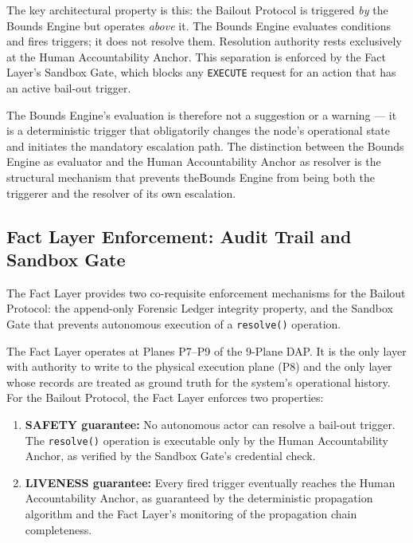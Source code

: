 The key architectural property is this: the Bailout Protocol is triggered \emph{by} the Bounds Engine but operates \emph{above} it. The Bounds Engine evaluates conditions and fires triggers; it does not resolve them. Resolution authority rests exclusively at the Human Accountability Anchor. This separation is enforced by the Fact Layer's Sandbox Gate, which blocks any \texttt{EXECUTE} request for an action that has an active bail-out trigger.

The Bounds Engine's evaluation is therefore not a suggestion or a warning --- it is a deterministic trigger that obligatorily changes the node's operational state and initiates the mandatory escalation path. The distinction between the Bounds Engine as evaluator and the Human Accountability Anchor as resolver is the structural mechanism that prevents theBounds Engine from being both the triggerer and the resolver of its own escalation.

\subsection{Fact Layer Enforcement: Audit Trail and Sandbox Gate}
\label{sec:fact-layer-enforcement}

The Fact Layer provides two co-requisite enforcement mechanisms for the Bailout Protocol: the append-only Forensic Ledger integrity property, and the Sandbox Gate that prevents autonomous execution of a \texttt{resolve()} operation.

The Fact Layer operates at Planes P7--P9 of the 9-Plane DAP. It is the only layer with authority to write to the physical execution plane (P8) and the only layer whose records are treated as ground truth for the system's operational history. For the Bailout Protocol, the Fact Layer enforces two properties:

\begin{enumerate}
  \item \textbf{SAFETY guarantee:} No autonomous actor can resolve a bail-out trigger. The \texttt{resolve()} operation is executable only by the Human Accountability Anchor, as verified by the Sandbox Gate's credential check.

  \item \textbf{LIVENESS guarantee:} Every fired trigger eventually reaches the Human Accountability Anchor, as guaranteed by the deterministic propagation algorithm and the Fact Layer's monitoring of the propagation chain completeness.
\end{enumerate}

